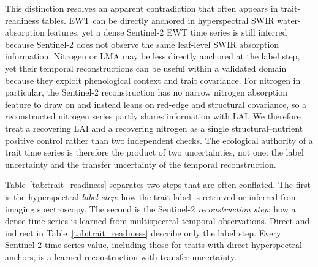 \documentclass[pdflatex,sn-mathphys-num]{sn-jnl}
\begin{document}
This distinction resolves an apparent contradiction that often appears in trait-readiness tables. EWT can be directly anchored in hyperspectral SWIR water-absorption features, yet a dense Sentinel-2 EWT time series is still inferred because Sentinel-2 does not observe the same leaf-level SWIR absorption information. Nitrogen or LMA may be less directly anchored at the label step, yet their temporal reconstructions can be useful within a validated domain because they exploit phenological context and trait covariance. For nitrogen in particular, the Sentinel-2 reconstruction has no narrow nitrogen absorption feature to draw on and instead leans on red-edge and structural covariance, so a reconstructed nitrogen series partly shares information with LAI. We therefore treat a recovering LAI and a recovering nitrogen as a single structural--nutrient positive control rather than two independent checks. The ecological authority of a trait time series is therefore the product of two uncertainties, not one: the label uncertainty and the transfer uncertainty of the temporal reconstruction.

Table~\ref{tab:trait_readiness} separates two steps that are often conflated. The first is the hyperspectral \textit{label step}: how the trait label is retrieved or inferred from imaging spectroscopy. The second is the Sentinel-2 \textit{reconstruction step}: how a dense time series is learned from multispectral temporal observations. Direct and indirect in Table~\ref{tab:trait_readiness} describe only the label step. Every Sentinel-2 time-series value, including those for traits with direct hyperspectral anchors, is a learned reconstruction with transfer uncertainty.
\end{document}
